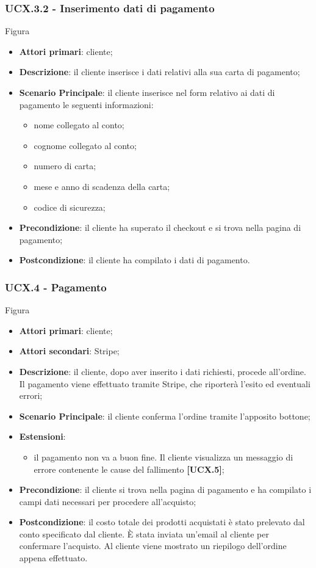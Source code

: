 \subsubsection{UCX.3.2 - Inserimento dati di pagamento}
Figura \\
\begin{itemize}
\item \textbf{Attori primari}: cliente;
\item \textbf{Descrizione}: il cliente inserisce i dati relativi alla sua carta di pagamento;
\item \textbf{Scenario Principale}: il cliente inserisce nel form relativo ai dati di pagamento le seguenti informazioni:
\begin{itemize}
	\item nome collegato al conto;
	\item cognome collegato al conto;
	\item numero di carta;
	\item mese e anno di scadenza della carta;
	\item codice di sicurezza;
\end{itemize}
\item \textbf{Precondizione}: il cliente ha superato il checkout e si trova nella pagina di pagamento;
\item \textbf{Postcondizione}: il cliente ha compilato i dati di pagamento.
\end{itemize}

\subsubsection{UCX.4 - Pagamento}
Figura \\
\begin{itemize}
\item \textbf{Attori primari}: cliente;
\item \textbf{Attori secondari}: Stripe;
\item \textbf{Descrizione}: il cliente, dopo aver inserito i dati richiesti, procede all'ordine. Il pagamento viene effettuato tramite Stripe, che riporterà l'esito ed eventuali errori;
\item \textbf{Scenario Principale}: il cliente conferma l'ordine tramite l'apposito bottone;
\item \textbf{Estensioni}:
\begin{itemize}
	\item il pagamento non va a buon fine. Il cliente visualizza un messaggio di errore contenente le cause del fallimento \textbf{[UCX.5]};
\end{itemize}
\item \textbf{Precondizione}: il cliente si trova nella pagina di pagamento e ha compilato i campi dati necessari per procedere all'acquisto;
\item \textbf{Postcondizione}: il costo totale dei prodotti acquistati è stato prelevato dal conto specificato dal cliente. È stata inviata un'email al cliente per confermare l'acquisto. Al cliente viene mostrato un riepilogo dell'ordine appena effettuato.
\end{itemize}

